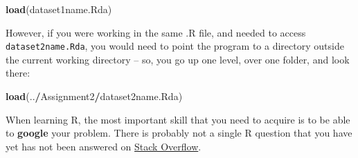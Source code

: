 \documentclass[
]{book}
\newenvironment{Shaded}{\begin{snugshade}}{\end{snugshade}}
\newcommand{\KeywordTok}[1]{\textcolor[rgb]{0.13,0.29,0.53}{\textbf{#1}}}
\newcommand{\NormalTok}[1]{#1}
\newcommand{\OperatorTok}[1]{\textcolor[rgb]{0.81,0.36,0.00}{\textbf{#1}}}
\begin{document}
\begin{Shaded}
\begin{Highlighting}[]
\KeywordTok{load}\NormalTok{(dataset1name.Rda)}
\end{Highlighting}
\end{Shaded}

However, if you were working in the same .R file, and needed to access \texttt{dataset2name.Rda}, you would need to point the program to a directory outside the current working directory -- so, you go up one level, over one folder, and look there:

\begin{Shaded}
\begin{Highlighting}[]
\KeywordTok{load}\NormalTok{(..}\OperatorTok{/}\NormalTok{Assignment2}\OperatorTok{/}\NormalTok{dataset2name.Rda)}
\end{Highlighting}
\end{Shaded}

When learning R, the most important skill that you need to acquire is to be able to \textbf{google} your problem. There is probably not a single R question that you have yet has not been answered on \href{https://stackoverflow.com/}{Stack Overflow}.

  
\end{document}
